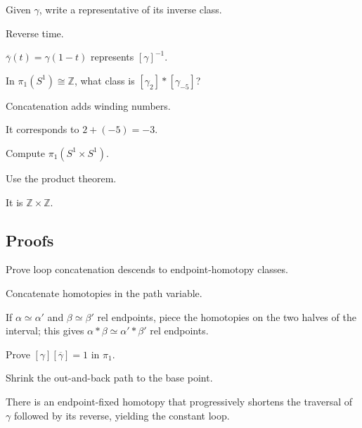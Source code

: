 \begin{exercise}\label{exr:viii09-ped-03}
Given $\gamma$, write a representative of its inverse class.
\end{exercise}
\begin{hint}
Reverse time.
\end{hint}
\begin{solution}
$\overline\gamma(t)=\gamma(1-t)$ represents $[\gamma]^{-1}$.
\end{solution}

\begin{exercise}\label{exr:viii09-ped-04}
In $\pi_1(S^1)\cong\mathbb Z$, what class is $[\gamma_2]*[\gamma_{-5}]$?
\end{exercise}
\begin{hint}
Concatenation adds winding numbers.
\end{hint}
\begin{solution}
It corresponds to $2+(-5)=-3$.
\end{solution}

\begin{exercise}\label{exr:viii09-ped-05}
Compute $\pi_1(S^1\times S^1)$.
\end{exercise}
\begin{hint}
Use the product theorem.
\end{hint}
\begin{solution}
It is $\mathbb Z\times\mathbb Z$.
\end{solution}

\subsection*{Proofs}

\begin{exercise}\label{exr:viii09-ped-06}
Prove loop concatenation descends to endpoint-homotopy classes.
\end{exercise}
\begin{hint}
Concatenate homotopies in the path variable.
\end{hint}
\begin{solution}
If $\alpha\simeq\alpha'$ and $\beta\simeq\beta'$ rel endpoints, piece the homotopies on the two halves of the interval; this gives $\alpha*\beta\simeq\alpha'*\beta'$ rel endpoints.
\end{solution}

\begin{exercise}\label{exr:viii09-ped-07}
Prove $[\gamma][\overline\gamma]=1$ in $\pi_1$.
\end{exercise}
\begin{hint}
Shrink the out-and-back path to the base point.
\end{hint}
\begin{solution}
There is an endpoint-fixed homotopy that progressively shortens the traversal of $\gamma$ followed by its reverse, yielding the constant loop.
\end{solution}

